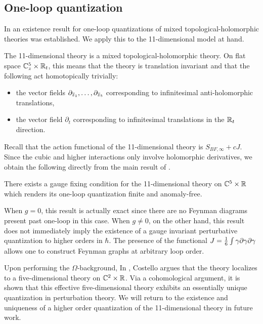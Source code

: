 
\subsection{One-loop quantization}

In \cite{GRWthf} an existence result for one-loop quantizations of mixed topological-holomorphic theories was established. 
We apply this to the 11-dimensional model at hand. 

The 11-dimensional theory is a mixed topological-holomorphic theory.
On flat space $\mathbb C^5_z \times \mathbb R_t$, this means that the theory is translation invariant and that the following act homotopically trivially:
\begin{itemize}
\item the vector fields $\partial_{\overline{z}_1}, \ldots, \partial_{\overline{z}_{5}}$ corresponding to infinitesimal anti-holomorphic translations,
\item the vector field $\partial_t$ corresponding to infinitesimal translations in the $\mathbb R_t$ direction. 
\end{itemize}

Recall that the action functional of the 11-dimensional theory is $S_{BF, \infty} + c J$. 
Since the cubic and higher interactions only involve holomorphic derivatives, we obtain the following directly from the main result of \cite{GRWthf}. 

\begin{thm}
There exists a gauge fixing condition for the 11-dimensional theory on $\mathbb C^5 \times \mathbb R$ which renders its one-loop quantization finite and anomaly-free. 
\end{thm} 

When $g=0$, this result is actually exact
since there are no Feynman diagrams present past one-loop in this case. 
When $g \ne 0$, on the other hand, this result does not immediately imply the existence of a gauge invariant perturbative quantization to higher orders in $\hbar$. 
The presence of the functional $J = \frac16 \int \gamma \partial \gamma \partial \gamma$ allows one to construct Feynman graphs at arbitrary loop order. 

Upon performing the $\Omega$-background,
In \cite{CostelloM5}, Costello argues that the theory localizes to a five-dimensional theory on $\mathbb C^2 \times \mathbb R$. 
Via a cohomological argument, it is shown that this effective five-dimensional theory exhibits an essentially unique quantization in perturbation theory. 
We will return to the existence and uniqueness of a higher order quantization of the 11-dimensional theory in future work. 

